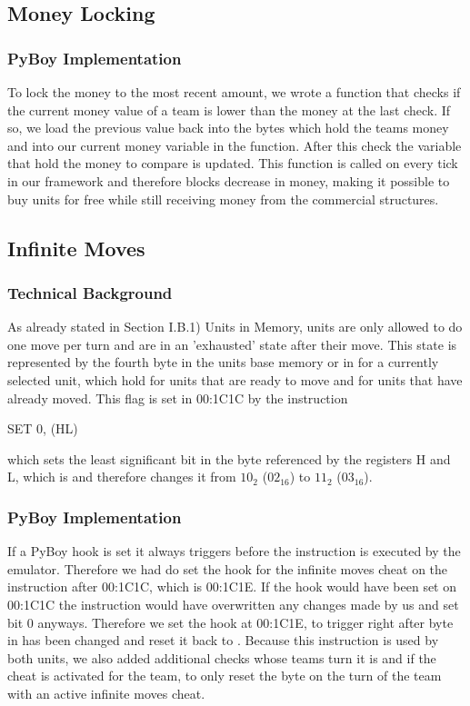 \subsection{Money Locking}
\subsubsection{PyBoy Implementation}
To lock the money to the most recent amount, we wrote a function that checks if the current money value of a team is lower than the money at the last check.
If so, we load the previous value back into the bytes which hold the teams money and into our current money variable in the function.
After this check the variable that hold the money to compare is updated.
This function is called on every tick in our framework and therefore blocks decrease in money, making it possible to buy units for free while still receiving money from the commercial structures.

\subsection{Infinite Moves}
\subsubsection{Technical Background}
As already stated in Section I.B.1) Units in Memory, units are only allowed to do one move per turn and are in an 'exhausted' state after their move. This state is represented by the fourth byte in the units base memory or in  for a currently selected unit, which hold  for units that are ready to move and  for units that have already moved.
This flag is set in 00:1C1C by the instruction

SET 0, (HL)

which sets the least significant bit in the byte referenced by the registers H and L, which is  and therefore changes it from $10_2$ ($02_{16}$) to $11_2$ ($03_{16}$).

\subsubsection{PyBoy Implementation}
If a PyBoy hook is set it always triggers before the instruction is executed by the emulator.
Therefore we had do set the hook for the infinite moves cheat on the instruction after 00:1C1C, which is 00:1C1E. If the hook would have been set on 00:1C1C the instruction would have overwritten any changes made by us and set bit 0 anyways.
Therefore we set the hook at 00:1C1E, to trigger right after byte in  has been changed and reset it back to .
Because this instruction is used by both units, we also added additional checks whose teams turn it is and if the cheat is activated for the team, to only reset the  byte on the turn of the team with an active infinite moves cheat. 

